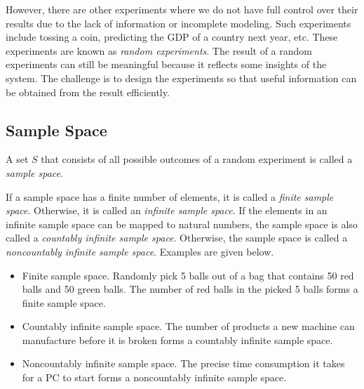 However, there are other experiments where we do not have full control over their results due to the lack of information or incomplete modeling. Such experiments include tossing a coin, predicting the GDP of a country next year, etc. These experiments are known as \textit{random experiments}. The result of a random experiments can still be meaningful because it reflects some insights of the system. The challenge is to design the experiments so that useful information can be obtained from the result efficiently.

\subsection{Sample Space}

A set $S$ that consists of all possible outcomes of a random experiment is called a \textit{sample space}.

If a sample space has a finite number of elements, it is called a \textit{finite sample space}. Otherwise, it is called an \textit{infinite sample space}. If the elements in an infinite sample space can be mapped to natural numbers, the sample space is also called a \textit{countably infinite sample space}. Otherwise, the sample space is called a \textit{noncountably infinite sample space}. Examples are given below.
\begin{itemize}
	\item Finite sample space. Randomly pick 5 balls out of a bag that contains 50 red balls and 50 green balls. The number of red balls in the picked 5 balls forms a finite sample space.
	\item Countably infinite sample space. The number of products a new machine can manufacture before it is broken forms a countably infinite sample space.
	\item Noncountably infinite sample space. The precise time consumption it takes for a PC to start forms a noncountably infinite sample space.
\end{itemize}

